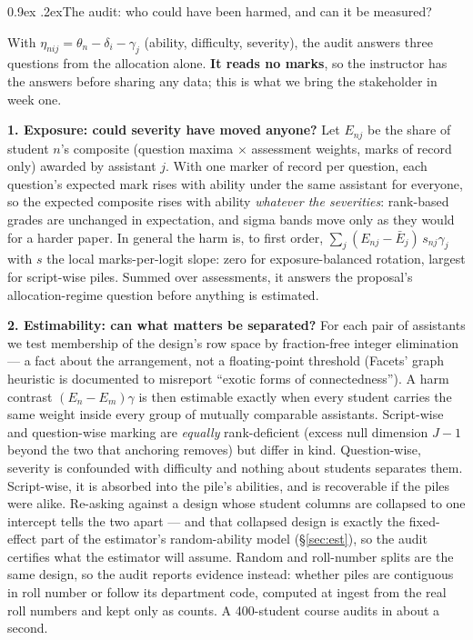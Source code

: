 \documentclass[10pt,a4paper]{article}
\makeatletter
\renewcommand\subsection{\@startsection{subsection}{2}{\z@}{-2.4ex \@plus -.5ex \@minus -.2ex}%
  {0.9ex \@plus .2ex}{\normalfont\large\bfseries}}
\makeatother
\begin{document}
\subsection{The audit: who could have been harmed, and can it be measured?}
\label{sec:audit}

With $\eta_{nij}=\theta_n-\delta_i-\gamma_j$ (ability, difficulty, severity), the audit answers
three questions from the allocation alone. \textbf{It reads no marks}, so the instructor has the
answers before sharing any data; this is what we bring the stakeholder in week one.

\textbf{1. Exposure: could severity have moved anyone?} Let $E_{nj}$ be the share of student $n$'s
composite (question maxima $\times$ assessment weights, marks of record only) awarded by assistant
$j$. With one marker of record per question, each question's expected mark rises with ability under
the same assistant for everyone, so the expected composite rises with ability \emph{whatever the
severities}: rank-based grades are unchanged in expectation, and sigma bands move only as they
would for a harder paper. In general the harm is, to first order,
$\sum_j (E_{nj}-\bar E_j)\,s_{nj}\gamma_j$ with $s$ the local marks-per-logit slope: zero for
exposure-balanced rotation, largest for script-wise piles. Summed over assessments, it answers the
proposal's allocation-regime question before anything is estimated.

\textbf{2. Estimability: can what matters be separated?} For each pair of assistants we test
membership of the design's row space by fraction-free integer elimination --- a fact about the
arrangement, not a floating-point threshold (Facets' graph heuristic is documented to misreport
``exotic forms of connectedness''). A harm contrast $(E_n-E_m)\gamma$ is then estimable exactly when
every student carries the same weight inside every group of mutually comparable assistants.
Script-wise and question-wise marking are \emph{equally} rank-deficient (excess null dimension
$J{-}1$ beyond the two that anchoring removes) but differ in kind. Question-wise, severity is
confounded with difficulty and nothing about students separates them. Script-wise, it is absorbed
into the pile's abilities, and is recoverable if the piles were alike. Re-asking against a design
whose student columns are collapsed to one intercept tells the two apart --- and that collapsed
design is exactly the fixed-effect part of the estimator's random-ability model (\S\ref{sec:est}),
so the audit certifies what the estimator will assume. Random and roll-number splits are the same
design, so the audit reports evidence instead: whether piles are contiguous in roll number or follow
its department code, computed at ingest from the real roll numbers and kept only as counts. A
400-student course audits in about a second.
\end{document}
